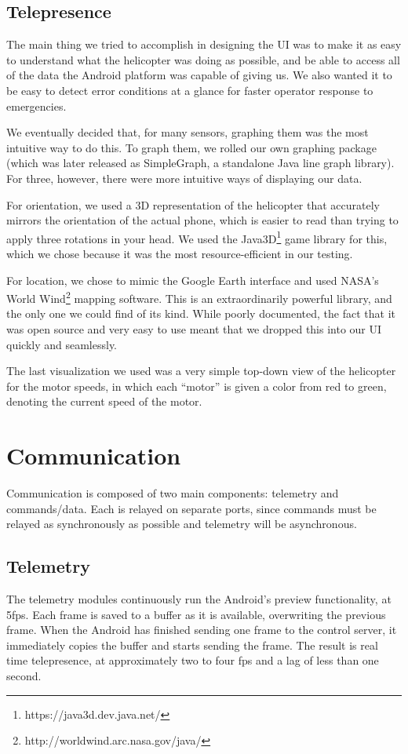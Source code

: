 \subsection{Telepresence}
The main thing we tried to accomplish in designing the UI was to make
it as easy to understand what the helicopter was doing as possible,
and be able to access all of the data the Android platform was capable
of giving us. We also wanted it to be easy to detect error conditions
at a glance for faster operator response to emergencies.

We eventually decided that, for many sensors, graphing them was the
most intuitive way to do this. To graph them, we rolled our own
graphing package (which was later released as SimpleGraph, a standalone
Java line graph library). For three, however, there were more
intuitive ways of displaying our data. 

For orientation, we used a 3D representation of the helicopter that
accurately mirrors the orientation of the actual phone, which is
easier to read than trying to apply three rotations in your head. We
used the Java3D\footnote{https://java3d.dev.java.net/} game library
for this, which we chose because it was the most resource-efficient in
our testing. 

For location, we chose to mimic the Google Earth interface and used
NASA's World Wind\footnote{http://worldwind.arc.nasa.gov/java/}
mapping software. This is an extraordinarily powerful library, and the
only one we could find of its kind. While poorly documented, the fact
that it was open source and very easy to use meant that we dropped
this into our UI quickly and seamlessly. 

The last visualization we used was a very simple top-down view of the
helicopter for the motor speeds, in which each ``motor'' is given a
color from red to green, denoting the current speed of the motor.

\section{Communication}
Communication is composed of two main components:‭ ‬telemetry and
commands/data.‭ ‬Each is relayed on separate ports,‭ ‬since commands must
be relayed as synchronously as possible and telemetry will be
asynchronous.

\subsection{Telemetry}
The telemetry modules continuously run the Android's preview
functionality,‭ ‬at‭ ‬5fps.‭  ‬Each frame is saved to a buffer as it is
available,‭ ‬overwriting the previous frame.‭  ‬When the Android has
finished sending one frame to the control server,‭ ‬it immediately
copies the buffer and starts sending the frame.‭  ‬The result is real
time telepresence,‭ ‬at approximately two to four fps and a lag of
less than one second.

